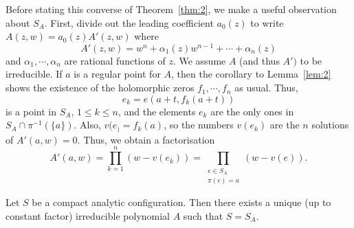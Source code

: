 \documentclass[a4paper,11pt]{article}
\begin{document}
Before stating this converse of Theorem~\ref{thm:2}, we make a useful
observation about $S_A$. First, divide out the leading coefficient
$a_0(z)$ to write $A(z,w) = a_0(z) A'(z,w)$ where
$$
A'(z,w) = w^n + \alpha_1(z) w^{n-1} + \cdots + \alpha_n(z)
$$
and $\alpha_1, \cdots, \alpha_n$ are rational functions of $z$.  We
assume $A$ (and thus $A')$ to be irreducible.  If $a$ is a regular
point for $A$, then the corollary to Lemma~\ref{lem:2} shows the
existence of the holomorphic zeros $f_1, \cdots, f_n$ as usual.  Thus,
$$
e_k  = e(a+t, f_k(a+t))
$$
is a point in $S_A$, $1\le k \le n$, and the elements $e_k$ are the
only ones in $S_A \cap \pi^{-1}(\{a\})$.  Also, $v(e_) = f_k(a)$, so
the numbers $v(e_k)$ are the $n$ solutions of $A'(a,w) = 0$.  Thus, we
obtain a factorisation
\begin{equation}
  \label{e:A'}
A'(a,w) = \prod_{k=1}^n (w - v(e_k)) = \prod_{\substack{e\in S_A\\
    \pi(e) = a}}(w - v(e)).
\end{equation}

\begin{thm}
  \label{thm:3}
  Let $S$ be a compact analytic configuration.  Then there exists a
  unique (up to constant factor) irreducible polynomial $A$ such that
  $S = S_A$.
\end{thm}
\end{document}
